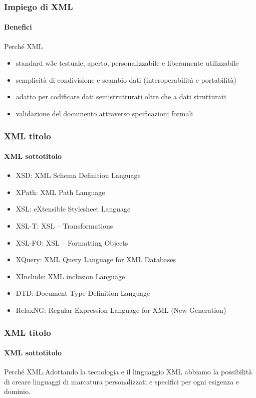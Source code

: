 \begin{frame}
	\frametitle{Impiego di XML}
	\framesubtitle{Benefici}
	\addtocounter{nframe}{1}

	\begin{block}{Perché XML}
		\begin{itemize}
			\item standard w3c testuale, aperto, personalizzabile e liberamente utilizzabile
			\item semplicità di condivisione e scambio dati (interoperabilità e portabilità)
			\item adatto per codificare dati semistrutturati oltre che a dati strutturati
			\item validazione del documento attraverso spcificazioni formali
		\end{itemize}

	\end{block}
	

\end{frame}


\begin{frame}
	\frametitle{XML titolo}
	\framesubtitle{XML sottotitolo}
	\addtocounter{nframe}{1}

	\begin{itemize}
		\item XSD: XML Schema Definition Language
		\item XPath: XML Path Language
		\item XSL: eXtensible Stylesheet Language
		\item XSL-T:  XSL – Transformations
		\item XSL-FO: XSL – Formatting Objects
		\item XQuery: XML Query Language for XML Databases
		\item XInclude: XML inclusion Language
		\item DTD: Document Type Definition Language
		\item RelaxNG: Regular Expression Language for XML (New Generation)
	\end{itemize}

\end{frame}


\begin{frame}
	\frametitle{XML titolo}
	\framesubtitle{XML sottotitolo}
	\addtocounter{nframe}{1}

	\begin{block}{Perché XML}
		Adottando la tecnologia e il linguaggio XML abbiamo la possibilità di creare linguaggi di marcatura personalizzati e specifici per ogni esigenza e dominio.
	\end{block}

\end{frame}

